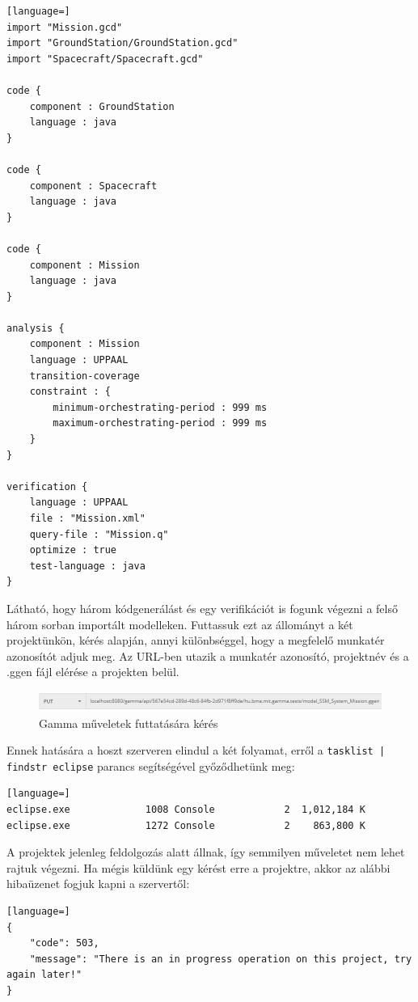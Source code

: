 \begin{lstlisting}[language=]
import "Mission.gcd"
import "GroundStation/GroundStation.gcd"
import "Spacecraft/Spacecraft.gcd"

code {
	component : GroundStation
	language : java
}

code {
	component : Spacecraft
	language : java
}

code {
	component : Mission
	language : java
}

analysis {
	component : Mission
	language : UPPAAL
	transition-coverage
	constraint : {
		minimum-orchestrating-period : 999 ms
		maximum-orchestrating-period : 999 ms
	}
}

verification {
	language : UPPAAL
	file : "Mission.xml"
	query-file : "Mission.q"
	optimize : true
	test-language : java
}
\end{lstlisting}
Látható, hogy három kódgenerálást és egy verifikációt is fogunk végezni a felső három sorban importált modelleken. Futtassuk ezt az állományt a két projektünkön,  kérés alapján, annyi különbséggel, hogy a megfelelő munkatér azonosítót adjuk meg. Az URL-ben utazik a munkatér azonosító, projektnév és a .ggen fájl elérése a projekten belül.
\begin{figure}[!ht]
	\includegraphics[width=150mm, keepaspectratio]{figures/request_gamma_operation.PNG}
	\caption{Gamma műveletek futtatására kérés}
	\label{fig:request_gamma_operation}
\end{figure}

Ennek hatására a hoszt szerveren elindul a két folyamat, erről a \texttt{tasklist | findstr eclipse} parancs segítségével győződhetünk meg:
\begin{lstlisting}[language=]
eclipse.exe				1008 Console			2  1,012,184 K
eclipse.exe				1272 Console			2  	 863,800 K
\end{lstlisting}

A projektek jelenleg feldolgozás alatt állnak, így semmilyen műveletet nem lehet rajtuk végezni. Ha mégis küldünk egy kérést erre a projektre, akkor az alábbi hibaüzenet fogjuk kapni a szervertől:

\begin{lstlisting}[language=]
{
	"code": 503,
	"message": "There is an in progress operation on this project, try again later!"
}
\end{lstlisting}

